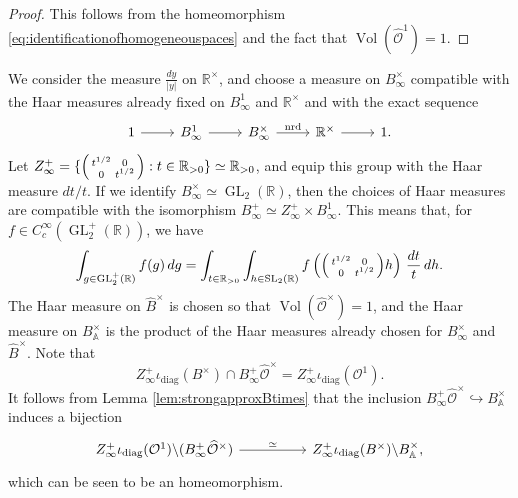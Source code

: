 \documentclass{article}
\theoremstyle{named}
\newcommand{\A}{\mathbb{A}}
\newcommand{\R}{\mathbb{R}}
\renewcommand{\O}{\mathcal{O}}
\DeclareMathOperator{\SL}{SL}
\DeclareMathOperator{\GL}{GL}
\DeclareMathOperator{\vol}{Vol}
\DeclareMathOperator{\nrd}{nrd}
\DeclareMathOperator{\diag}{diag}
\begin{document}
\begin{proof}
This follows from the homeomorphism \eqref{eq:identificationofhomogeneouspaces} and the fact that $\vol(\widehat{\O}^1) = 1$. 
\end{proof}
We consider the measure $\frac{dy}{|y|}$ on $\R^\times$, and choose a measure on $B_\infty^\times$ compatible with the Haar measures already fixed on $B^1_\infty$ and $\R^\times$ and with the exact sequence
\begin{equation*}
\begin{tikzcd}
1 \arrow[r] & B^1_\infty \arrow[r] & B^\times_\infty \arrow[r, "\nrd"] & \R^\times \arrow[r] & 1.
\end{tikzcd}
\end{equation*}
Let $Z_\infty^+ = \{\begin{psmallmatrix}
    t^{1/2} & 0\\
    0 & t^{1/2}
\end{psmallmatrix}: t \in \R_{> 0}\} \simeq \R_{> 0}$, and equip this group with the Haar measure $dt/t$. If we identify $B_\infty^\times \simeq \GL_2(\R)$, then the choices of Haar measures are compatible with the isomorphism $B_\infty^+ \simeq Z_\infty^+ \times B_\infty^1$. This means that, for $f \in C_c^\infty(\GL_2^+(\R))$, we have 
\begin{equation}\label{eq:haarmeasuregl2sl2}
    \int_{g \in \GL_2^+(\R)} f(g) \, dg = \int_{t \in \R_{> 0}}\int_{h \in \SL_2(\R)} f\left(\begin{psmallmatrix}
    t^{1/2} & 0\\
    0 & t^{1/2}
\end{psmallmatrix}h\right)\, \frac{dt}{t}\, dh.
\end{equation}  
The Haar measure on $\widehat{B}^\times$ is chosen so that $\vol(\widehat{\O}^\times) = 1$, and the Haar measure on $B_\A^\times$ is the product of the Haar measures already chosen for $B_\infty^\times$ and $\widehat{B}^\times$. Note that 
\begin{equation*}
    Z_\infty^+ \iota_{\diag}(B^\times) \cap B_\infty^+ \widehat{\O}^\times = Z_\infty^+ \iota_{\diag}(\O^1).
\end{equation*}
It follows from Lemma \ref{lem:strongapproxBtimes} that the inclusion $B_\infty^+ \widehat{\O}^\times \hookrightarrow B_\A^\times$ induces a bijection
\begin{equation}\label{auxeq:homogeneousspaceBtimes}
\begin{tikzcd}
Z_\infty^+\iota_{\diag}(\O^1) \backslash (B_\infty^+ \widehat{\O}^\times) \arrow[rr, "\simeq"] &  & Z_\infty^+\iota_{\diag}(B^\times) \backslash B_\A^\times,
\end{tikzcd}
\end{equation}
which can be seen to be an homeomorphism.
\end{document}
